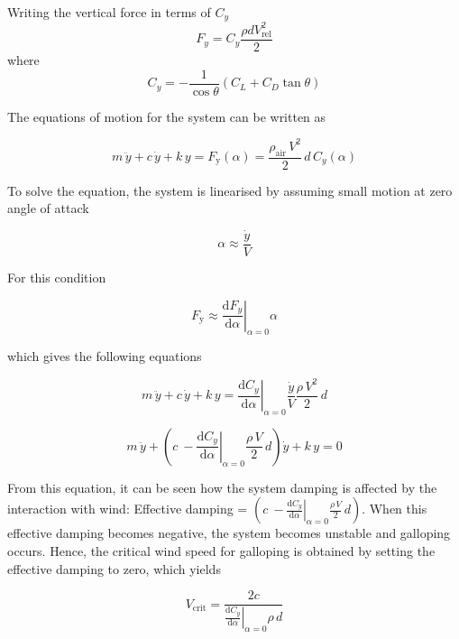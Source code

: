 \documentclass[../main]{subfiles}
\begin{document}
Writing the vertical force in terms of \(C_y\)
\[
F_y = C_y \frac{\rho d V_{\mathrm{rel}}^2}{2}
\]
where 
\[
\quad C_y = -\frac{1}{\cos\theta}(C_L + C_D \tan\theta) \quad
\]

The equations of motion for the system can be written as

\begin{equation}
m\,\ddot{y} + c\,\dot{y} + k\,y = F_{\mathrm{y}}(\alpha) = \frac{\rho_{\mathrm{air}}\,V^2}{2}\,d\,C_y(\alpha)
\end{equation}

To solve the equation, the system is linearised by assuming small motion at zero angle of attack 

\begin{equation}
\alpha \approx \frac{\dot{y}}{V}
\end{equation}

For this condition

\begin{equation}
F_{\mathrm{y}} \approx \left.\frac{\mathrm{d}F_y}{\mathrm{d}\alpha}\right|_{\alpha=0}\alpha
\end{equation}

which gives the following equations

\begin{equation}
m\,\ddot{y} + c\,\dot{y} + k\,y = \left.\frac{\mathrm{d}C_y}{\mathrm{d}\alpha}\right|_{\alpha=0}\frac{\dot{y}}{V}\frac{\rho\,V^2}{2}\,d
\end{equation}

\begin{equation}
m\,\ddot{y} + \left(c\ -\left.\frac{\mathrm{d}C_y}{\mathrm{d}\alpha}\right|_{\alpha=0}\frac{\rho\,V}{2}\,d \right)\dot{y} + k\,y = 0
\end{equation}

From this equation, it can be seen how the system damping is affected by the interaction with wind: Effective damping = \(\left(c\ -\left.\frac{\mathrm{d}C_y}{\mathrm{d}\alpha}\right|_{\alpha=0}\frac{\rho\,V}{2}\,d \right)\). 
When this effective damping becomes negative, the system becomes unstable and galloping occurs. 
Hence, the critical wind speed for galloping is obtained by setting the effective damping to zero, which yields

\begin{equation}
V_{\mathrm{crit}} = \frac{2c}{\left.\frac{\mathrm{d}C_y}{\mathrm{d}\alpha}\right|_{\alpha=0}\rho\,d}
\end{equation}
\end{document}
